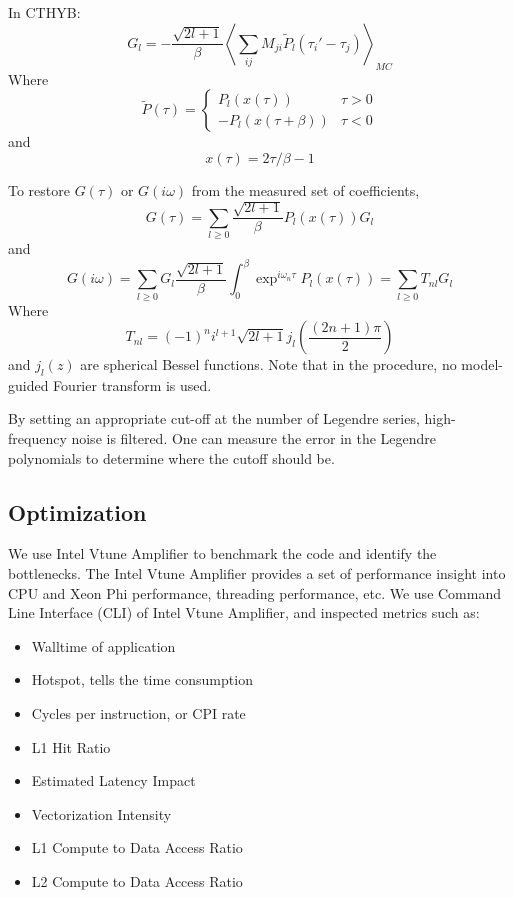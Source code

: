 In CTHYB:
\[
G_l=-\frac{\sqrt{2l+1}}{\beta}\left\langle\sum_{ij}M_{ji}\tilde{P}_l(\tau_i'-\tau_j)\right\rangle_{MC}
\]
Where
\[
\tilde{P}(\tau)=\left\{
\begin{array}{ll}
  P_l(x(\tau))& \tau >0\\
  -P_l(x(\tau+\beta))&\tau<0
\end{array}
\right.
\]
and \[
x(\tau)=2\tau/\beta-1
\]

To restore $G(\tau)$ or $G(i\omega)$ from the measured set of coefficients,
\[
G(\tau) = \sum_{l\ge 0}\frac{\sqrt{2l+1}}{\beta}P_l(x(\tau))G_l
\]
and
\[
G(i\omega) = \sum_{l\ge 0} G_l\frac{\sqrt{2l+1}}{\beta}\int_0^\beta\exp^{i\omega_n\tau}P_l(x(\tau))=\sum_{l\ge 0}T_{nl}G_l
\]
Where
\[
T_{nl}=(-1)^ni^{l+1}\sqrt{2l+1}j_l\left(\frac{(2n+1)\pi}{2}\right)
\]
and $j_l(z)$ are spherical Bessel functions. Note that in the procedure, no model-guided Fourier transform is used.

By setting an appropriate cut-off at the number of Legendre series, high-frequency noise is filtered. 
One can measure the error in the Legendre polynomials to determine where the cutoff should be.




\subsection{Optimization}
We use Intel Vtune Amplifier to benchmark the code and identify the bottlenecks.
The Intel Vtune Amplifier provides a set of performance insight into CPU and
Xeon Phi performance, threading performance, etc. We use Command Line Interface (CLI)
of Intel Vtune Amplifier, and inspected metrics such as:
\begin{itemize}
\item Walltime of application
\item Hotspot, tells the time consumption 
\item Cycles per instruction, or CPI rate %
\item L1 Hit Ratio
\item Estimated Latency Impact
\item Vectorization Intensity
\item L1 Compute to Data Access Ratio
\item L2 Compute to Data Access Ratio
\end{itemize}

